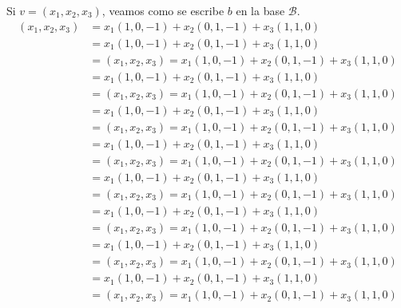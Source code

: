 \documentclass[handout]{beamer} %
\newcommand{\cB}{\mathcal{B}}
\begin{document}
    \begin{frame}
        Si $ v= (x_1, x_2, x_3)$, veamos como se escribe $b$ en la base $\cB$.
        \begin{align*}
            (x_1, x_2, x_3) &= x_1(1,0,-1) + x_2(0,1,-1) + x_3(1,1,0)\\
            &= x_1(1,0,-1) + x_2(0,1,-1) + x_3(1,1,0)\\
            &= (x_1, x_2, x_3) = x_1(1,0,-1) + x_2(0,1,-1) + x_3(1,1,0)\\
            &= x_1(1,0,-1) + x_2(0,1,-1) + x_3(1,1,0)\\
            &= (x_1, x_2, x_3) = x_1(1,0,-1) + x_2(0,1,-1) + x_3(1,1,0)\\
            &= x_1(1,0,-1) + x_2(0,1,-1) + x_3(1,1,0)\\
            &= (x_1, x_2, x_3) = x_1(1,0,-1) + x_2(0,1,-1) + x_3(1,1,0)\\
            &= x_1(1,0,-1) + x_2(0,1,-1) + x_3(1,1,0)\\
            &= (x_1, x_2, x_3) = x_1(1,0,-1) + x_2(0,1,-1) + x_3(1,1,0)\\
            &= x_1(1,0,-1) + x_2(0,1,-1) + x_3(1,1,0)\\
            &= (x_1, x_2, x_3) = x_1(1,0,-1) + x_2(0,1,-1) + x_3(1,1,0)\\
            &= x_1(1,0,-1) + x_2(0,1,-1) + x_3(1,1,0)\\
            &= (x_1, x_2, x_3) = x_1(1,0,-1) + x_2(0,1,-1) + x_3(1,1,0)\\
            &= x_1(1,0,-1) + x_2(0,1,-1) + x_3(1,1,0)\\
            &= (x_1, x_2, x_3) = x_1(1,0,-1) + x_2(0,1,-1) + x_3(1,1,0)\\
            &= x_1(1,0,-1) + x_2(0,1,-1) + x_3(1,1,0)\\
            &= (x_1, x_2, x_3) = x_1(1,0,-1) + x_2(0,1,-1) + x_3(1,1,0)\\
        \end{align*}
    \end{frame}
\end{document}
